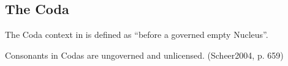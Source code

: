 \subsection{The Coda}

The Coda context in \CVCV is defined as
\enquote{before a governed empty Nucleus}.

Consonants in Codas are ungoverned and unlicensed. (Scheer2004, p. 659)